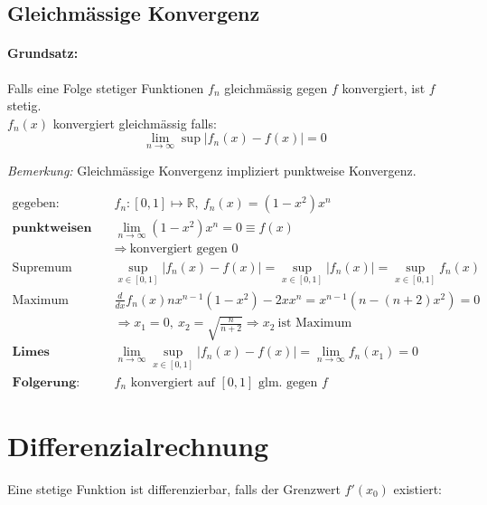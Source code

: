 \documentclass[11pt]{article}
\begin{document}
\subsection{Gleichm{\"a}ssige Konvergenz}

\paragraph{Grundsatz:} Falls eine Folge stetiger Funktionen $f_n$ gleichm{\"a}ssig gegen $f$ konvergiert, ist $f$ stetig.\\

$f_n(x)$ konvergiert gleichm{\"a}ssig falls:
\begin{equation*}
	\lim_{n\rightarrow\infty} \sup|f_n(x) - f(x)| = 0
\end{equation*}

\emph{Bemerkung:} Gleichm{\"a}ssige Konvergenz impliziert punktweise Konvergenz.

\begin{equation*}
\begin{split}
	\text{gegeben:} \quad & f_n:[0,1] \mapsto \mathbb{R},\ f_n(x) = (1 - x^2)x^n \\
	\textbf{punktweisen Limes berechnen:} \quad & \lim_{n \to \infty} (1 - x^2)x^n = 0 \equiv f(x) \\
	& \Rightarrow\ \text{konvergiert gegen 0} \\
	\text{Supremum berechnen:} \quad & \sup_{x \in [0,1]} |f_n(x) -f(x)| = \sup_{x \in [0,1]} |f_n(x)| = \sup_{x \in [0,1]}f_n(x) \\
	\text{Maximum finden:} \quad & \frac{d}{dx} f_n(x) nx^{n-1}(1-x^2)-2xx^n = x^{n-1}(n - (n+2)x^2) = 0 \\
	& \Rightarrow x_1 = 0,\ x_2 = \sqrt{\frac{n}{n+2}} \Rightarrow x_2\ \text{ist Maximum} \\
	\textbf{Limes berechnen:} \quad & \lim_{n \to \infty} \sup_{x \in [0,1]} |f_n(x) - f(x)| = \lim_{n \to \infty} f_n(x_1) = 0 \\
	\textbf{Folgerung:} \quad & \text{$f_n$ konvergiert auf $[0,1]$ glm. gegen $f$}
\end{split}
\end{equation*}

\section{Differenzialrechnung}

Eine stetige Funktion ist differenzierbar, falls der Grenzwert $f'(x_0)$ existiert:
\end{document}
